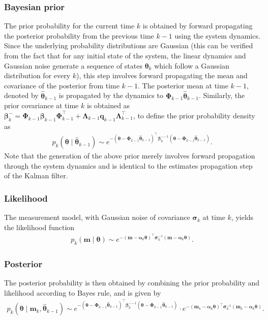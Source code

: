 \documentclass{resonance}
\def\th{\bm{\theta}}
\def\thh{\bm{\hat{\theta}}}
\def\q{\mathbf{q}}
\def\m{\bm{m}}
\def\p{\bm{\beta}}
\def\S{\bm{\sigma}}
\def\H{\bm{\alpha}}
\def\PhiB{\boldsymbol{\Phi}}
\def\LambdaB{\boldsymbol{\Lambda}}
\begin{document}
\subsubsection*{Bayesian prior}
The prior probability for the current time $k$ is obtained by
forward propagating the posterior probability from the previous time $k-1$
using the system dynamics. Since the underlying probability distributions are
Gaussian (this can be verified from the fact that for any initial state of the system, the linear dynamics and Gaussian noise generate a sequence of 
states $\th_k$ which follow a Gaussian distribution for every $k$), 
this step involves forward propagating the mean and covariance of the posterior
from time $k-1$. The posterior mean at time $k-1$, denoted by $\thh_{k-1}$ 
is propagated by the dynamics to $\PhiB_{k-1} \thh_{k-1}$. Similarly, 
the prior covariance at time $k$ is obtained as $\p_k^{-} = \PhiB_{k-1} \p_{k-1} \PhiB_{k-1}^\top + \LambdaB_{k-1} \q_{k-1} \LambdaB_{k-1}^\top$,
to define the prior probability density as
\begin{align*}
    p_k \left( \th \; | \; \thh_{k-1} \right) \sim e^{ - \left( \th - \PhiB_{k-1} \thh_{k-1} \right)^\top {\p_k^{-}}^{-1}  \left( \th - \PhiB_{k-1} \thh_{k-1} \right)}.
\end{align*}
Note that the generation of the above prior merely involves
forward propagation through the system dynamics and is identical
to the estimates propagation step of the Kalman filter.

\subsubsection*{Likelihood}
The measurement model, with Gaussian noise of covariance $\S_k$ at time $k$, yields the likelihood function
\begin{align*}
    p_k \left( \m  \; | \; \th \right) \sim e^{ - \left( \m - \H_k \th \right)^\top \S_k^{-1}  \left( \m - \H_k \th \right)}.
\end{align*}

\subsubsection*{Posterior}
The posterior probability is then obtained by combining the prior probability 
and likelihood according to Bayes rule, and is given by
\begin{align*}
    p_k \left( \th  \; | \; \m_k, \thh_{k-1} \right) \sim e^{ - \left( \th - \PhiB_{k-1} \thh_{k-1} \right)^\top {\p_k^{-}}^{-1}  \left( \th - \PhiB_{k-1} \thh_{k-1} \right)} \cdot 
    e^{ - \left( \m_{k} - \H_k \th \right)^\top \S_k^{-1}  \left( \m_k - \H_k \th \right)}.
\end{align*}
\end{document}
